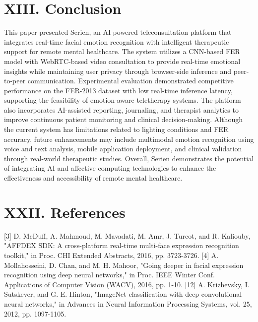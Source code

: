 \documentclass[conference]{IEEEtran}
\begin{document}
\section{XIII. Conclusion}
This paper presented Serien, an AI-powered teleconsultation platform that integrates real-time facial emotion recognition with intelligent therapeutic support for remote mental healthcare. The system utilizes a CNN-based FER model with WebRTC-based video consultation to provide real-time emotional insights while maintaining user privacy through browser-side inference and peer-to-peer communication.
Experimental evaluation demonstrated competitive performance on the FER-2013 dataset with low real-time inference latency, supporting the feasibility of emotion-aware teletherapy systems. The platform also incorporates AI-assisted reporting, journaling, and therapist analytics to improve continuous patient monitoring and clinical decision-making.
Although the current system has limitations related to lighting conditions and FER accuracy, future enhancements may include multimodal emotion recognition using voice and text analysis, mobile application deployment, and clinical validation through real-world therapeutic studies. Overall, Serien demonstrates the potential of integrating AI and affective computing technologies to enhance the effectiveness and accessibility of remote mental healthcare.
\section{XXII. References}
[3] D. McDuff, A. Mahmoud, M. Mavadati, M. Amr, J. Turcot, and R. Kaliouby, "AFFDEX SDK: A cross-platform real-time multi-face expression recognition toolkit," in Proc. CHI Extended Abstracts, 2016, pp. 3723-3726.
[4] A. Mollahosseini, D. Chan, and M. H. Mahoor, "Going deeper in facial expression recognition using deep neural networks," in Proc. IEEE Winter Conf. Applications of Computer Vision (WACV), 2016, pp. 1-10.
[12] A. Krizhevsky, I. Sutskever, and G. E. Hinton, "ImageNet classification with deep convolutional neural networks," in Advances in Neural Information Processing Systems, vol. 25, 2012, pp. 1097-1105.
\end{document}

